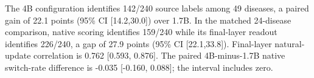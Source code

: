 The 4B configuration identifies 142/240 source labels among 49 diseases, a paired gain of 22.1 points (95\% CI [14.2,30.0]) over 1.7B. In the matched 24-disease comparison, native scoring identifies 159/240 while its final-layer readout identifies 226/240, a gap of 27.9 points (95\% CI [22.1,33.8]). Final-layer natural-update correlation is 0.762 [0.593, 0.876]. The paired 4B-minus-1.7B native switch-rate difference is -0.035 [-0.160, 0.088]; the interval includes zero.
